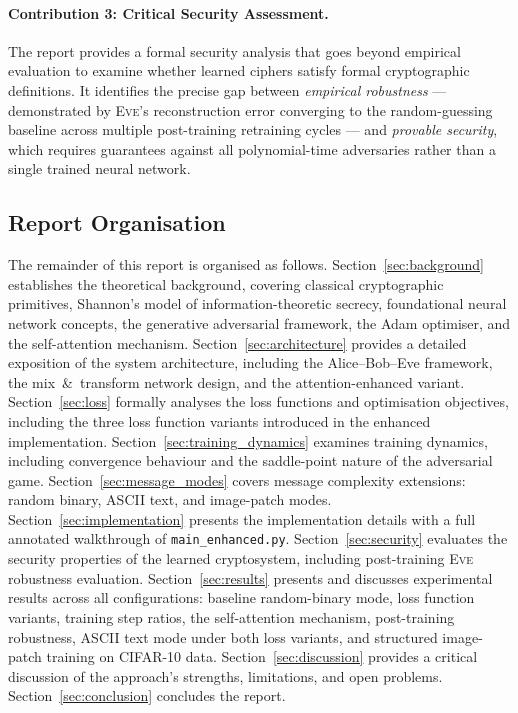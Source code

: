 \documentclass[12pt, a4paper]{article}
\newcommand{\eve}{\textsc{Eve}}
\newcommand{\code}[1]{\texttt{\color{CodeRed}#1}}
\begin{document}
\paragraph{Contribution 3: Critical Security Assessment.}
The report provides a formal security analysis that goes beyond
empirical evaluation to examine whether learned ciphers satisfy formal
cryptographic definitions. It identifies the precise gap between
\emph{empirical robustness} — demonstrated by \eve{}'s reconstruction
error converging to the random-guessing baseline across multiple
post-training retraining cycles — and \emph{provable security}, which
requires guarantees against all polynomial-time adversaries rather than
a single trained neural network.

\subsection{Report Organisation}
\label{subsec:organisation}

The remainder of this report is organised as follows.
Section~\ref{sec:background} establishes the theoretical background,
covering classical cryptographic primitives, Shannon's model of
information-theoretic secrecy, foundational neural network concepts,
the generative adversarial framework, the Adam optimiser, and the
self-attention mechanism.
Section~\ref{sec:architecture} provides a detailed exposition of the system architecture,
including the Alice–Bob–Eve framework, the mix~\&~transform network
design, and the attention-enhanced variant.
Section~\ref{sec:loss} formally analyses the loss functions and optimisation
objectives, including the three loss function variants introduced in
the enhanced implementation.
Section~\ref{sec:training_dynamics} examines training dynamics, including convergence behaviour
and the saddle-point nature of the adversarial game.
Section~\ref{sec:message_modes} covers message complexity extensions: random binary, ASCII
text, and image-patch modes.
Section~\ref{sec:implementation} presents the implementation details with a full annotated
walkthrough of \code{main\_enhanced.py}.
Section~\ref{sec:security} evaluates the security properties of the learned
cryptosystem, including post-training \eve{} robustness evaluation.
Section~\ref{sec:results} presents and discusses experimental results
across all configurations: baseline random-binary mode, loss function
variants, training step ratios, the self-attention mechanism,
post-training robustness, ASCII text mode under both loss variants,
and structured image-patch training on CIFAR-10 data.
Section~\ref{sec:discussion} provides a critical discussion of the approach's strengths,
limitations, and open problems.
Section~\ref{sec:conclusion} concludes the report.
\end{document}
